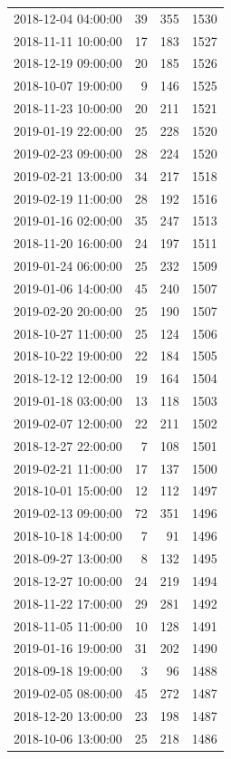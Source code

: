 \begin{tabular}{lrrr}
2018-12-04 04:00:00 & 39 & 355 & 1530 \\
2018-11-11 10:00:00 & 17 & 183 & 1527 \\
2018-12-19 09:00:00 & 20 & 185 & 1526 \\
2018-10-07 19:00:00 & 9 & 146 & 1525 \\
2018-11-23 10:00:00 & 20 & 211 & 1521 \\
2019-01-19 22:00:00 & 25 & 228 & 1520 \\
2019-02-23 09:00:00 & 28 & 224 & 1520 \\
2019-02-21 13:00:00 & 34 & 217 & 1518 \\
2019-02-19 11:00:00 & 28 & 192 & 1516 \\
2019-01-16 02:00:00 & 35 & 247 & 1513 \\
2018-11-20 16:00:00 & 24 & 197 & 1511 \\
2019-01-24 06:00:00 & 25 & 232 & 1509 \\
2019-01-06 14:00:00 & 45 & 240 & 1507 \\
2019-02-20 20:00:00 & 25 & 190 & 1507 \\
2018-10-27 11:00:00 & 25 & 124 & 1506 \\
2018-10-22 19:00:00 & 22 & 184 & 1505 \\
2018-12-12 12:00:00 & 19 & 164 & 1504 \\
2019-01-18 03:00:00 & 13 & 118 & 1503 \\
2019-02-07 12:00:00 & 22 & 211 & 1502 \\
2018-12-27 22:00:00 & 7 & 108 & 1501 \\
2019-02-21 11:00:00 & 17 & 137 & 1500 \\
2018-10-01 15:00:00 & 12 & 112 & 1497 \\
2019-02-13 09:00:00 & 72 & 351 & 1496 \\
2018-10-18 14:00:00 & 7 & 91 & 1496 \\
2018-09-27 13:00:00 & 8 & 132 & 1495 \\
2018-12-27 10:00:00 & 24 & 219 & 1494 \\
2018-11-22 17:00:00 & 29 & 281 & 1492 \\
2018-11-05 11:00:00 & 10 & 128 & 1491 \\
2019-01-16 19:00:00 & 31 & 202 & 1490 \\
2018-09-18 19:00:00 & 3 & 96 & 1488 \\
2019-02-05 08:00:00 & 45 & 272 & 1487 \\
2018-12-20 13:00:00 & 23 & 198 & 1487 \\
2018-10-06 13:00:00 & 25 & 218 & 1486 \\

\end{tabular}
